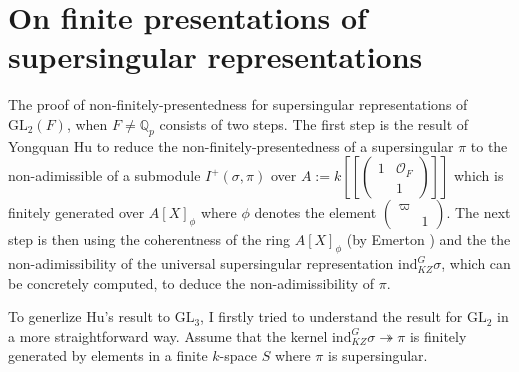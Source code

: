 \documentclass{amsart}
\newcommand{\Q}{\mathbb{Q}}
\newcommand{\N}{\mathbb{N}}
\newcommand{\cO}{\mathcal{O}}
\newcommand{\GL}{\text{GL}}
\newcommand{\ind}{\text{ind}}
\newcommand{\mtwo}[4]{\begin{pmatrix}
	#1&#2\\#3&#4
\end{pmatrix}}
\numberwithin{equation}{section}
\begin{document}
\section{On finite presentations of supersingular representations}
The proof of non-finitely-presentedness for supersingular representations of $\GL_2(F)$, when $F\neq \Q_p$ consists of two steps. The first step is the result of Yongquan Hu to reduce the non-finitely-presentedness of a supersingular $\pi$ to the non-adimissible of a submodule $I^+(\sigma,\pi)$ over $A:=k[[\mtwo{1}{\cO_F}{}{1}]]$ which is finitely generated over $A[X]_{\phi}$ where $\phi$ denotes the element $\mtwo{\varpi}{}{}{1}$. The next step is then using the coherentness of the ring $A[X]_{\phi}$ (by Emerton \cite{emerton2008class}) and the the non-adimissibility of the universal supersingular representation $\ind_{KZ}^{G}\sigma$, which can be concretely computed, to deduce the non-adimissibility of $\pi$.\par
To generlize Hu's result to $\GL_3$, I firstly tried to understand the result for $\GL_2$ in a more straightforward way. Assume that the kernel $\ind_{KZ}^G\sigma\twoheadrightarrow \pi$ is finitely generated by elements in a finite $k$-space $S$ where $\pi$ is supersingular. 
\end{document}
